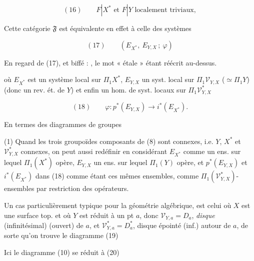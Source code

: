\documentclass[11pt,a4paper]{article}
\begin{document}
\[
  (16) \qquad F|X^{*} \text{ et } F|Y \text{ localement triviaux} ,
\]

Cette catégorie $\mathfrak{F}$ est équivalente en effet à celle des systèmes

\[
  (17) \qquad (E_{X^{*}},\ E_{Y,X}\,;\ \varphi)
\]

En regard de (17), et biffé : , le mot
« étale » étant réécrit au-dessus.

où $E_{X^{*}}$ est un système local sur $\Pi_1 X^{*}$, $E_{Y,X}$ un syst. local
sur $\Pi_1\mathcal{V}_{Y,X}$ ($\simeq \Pi_1 Y$) (donc un rev. ét. de $Y$) et
enfin un hom. de syst. locaux sur $\Pi_1\mathcal{V}^{*}_{Y,X}$

\[
  (18) \qquad \varphi \colon p^{*}(E_{Y,X}) \longrightarrow i^{*}(E_{X^{*}}) .
\]

En termes des diagrammes de groupes

(1\ill) Quand les trois groupoïdes composants de (8) sont connexes, i.e. $Y$,
$X^{*}$ et $\mathcal{V}^{*}_{Y,X}$ connexes, on peut aussi redéfinir en
considérant $E_{X^{*}}$ comme un ens. sur lequel $\Pi_1(X^{*})$ opère,
$E_{Y,X}$ un ens. sur lequel $\Pi_1(Y)$ opère, et $p^{*}(E_{Y,X})$ et
$i^{*}(E_{X^{*}})$ dans (18) comme étant ces mêmes ensembles, comme
$\Pi_1(\mathcal{V}^{*}_{Y,X})$-ensembles par restriction des opérateurs.



Un cas particulièrement typique pour la géométrie algébrique, est celui où $X$
est une surface top. et où $Y$ est réduit à un pt $a$, donc
$\mathcal{V}_{Y,a} = D_a$, \emph{disque} (infinitésimal) (ouvert) de $a$, et
$\mathcal{V}^{*}_{Y,a} = D^{*}_a$, disque épointé (inf.) autour de $a$, de
sorte qu'on trouve le diagramme  (19)


Ici le diagramme (10) se réduit à (20)

\end{document}
